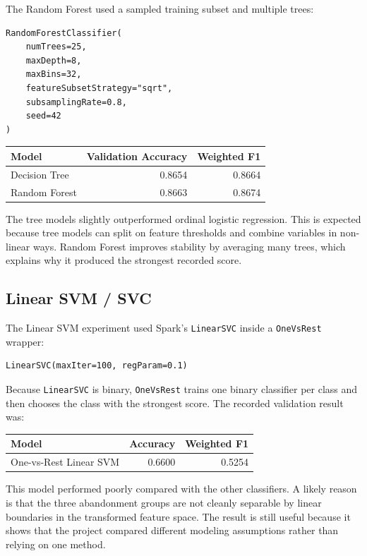 \documentclass[11pt,a4paper]{article}
\begin{document}
The Random Forest used a sampled training subset and multiple trees:
\begin{verbatim}
RandomForestClassifier(
    numTrees=25,
    maxDepth=8,
    maxBins=32,
    featureSubsetStrategy="sqrt",
    subsamplingRate=0.8,
    seed=42
)
\end{verbatim}

\begin{center}
\begin{tabular}{lrr}
\toprule
Model & Validation Accuracy & Weighted F1 \\
\midrule
Decision Tree & 0.8654 & 0.8664 \\
Random Forest & 0.8663 & 0.8674 \\
\bottomrule
\end{tabular}
\end{center}

The tree models slightly outperformed ordinal logistic regression. This is expected because tree models can split on feature thresholds and combine variables in non-linear ways. Random Forest improves stability by averaging many trees, which explains why it produced the strongest recorded score.

\subsection{Linear SVM / SVC}

The Linear SVM experiment used Spark's \texttt{LinearSVC} inside a \texttt{OneVsRest} wrapper:
\begin{verbatim}
LinearSVC(maxIter=100, regParam=0.1)
\end{verbatim}

Because \texttt{LinearSVC} is binary, \texttt{OneVsRest} trains one binary classifier per class and then chooses the class with the strongest score. The recorded validation result was:
\begin{center}
\begin{tabular}{lrr}
\toprule
Model & Accuracy & Weighted F1 \\
\midrule
One-vs-Rest Linear SVM & 0.6600 & 0.5254 \\
\bottomrule
\end{tabular}
\end{center}

This model performed poorly compared with the other classifiers. A likely reason is that the three abandonment groups are not cleanly separable by linear boundaries in the transformed feature space. The result is still useful because it shows that the project compared different modeling assumptions rather than relying on one method.
\end{document}
